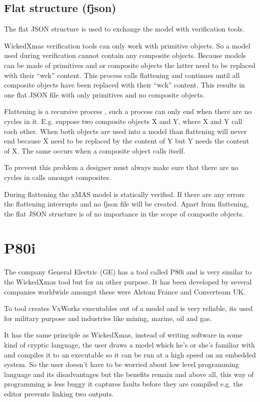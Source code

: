 \documentclass[a4paper,11pt,final]{article}
\begin{document}
\subsection{Flat structure (fjson)}
The flat JSON structure is used to exchange the model with verification tools.

WickedXmas verification tools can only work with primitive objects. So a model used during
verification cannot contain any composite objects.
Because models can be made of primitives and or composite objects the
latter need to be replaced with their ``wck'' content.
This process calls flattening and continues until all composite objects have
been replaced with their ``wck'' content.
This results in one flat JSON file with only primitives and no composite objects.

Flattening is a recursive process , such a process can only end when there are no cycles in it.
E.g. suppose two composite objects X and Y, where X and Y call each other.
When both objects are used into a model than flattening will never end because X need to be
replaced by the content of Y but Y needs the content of X.
The same occurs when a composite object calls itself.

To prevent this problem a designer must always make sure that there are no cycles in
calls amongst composites.

During flattening the xMAS model is statically verified.
If there are any errors the flattening interrupts and no fjson file will be created.
Apart from flattening, the flat JSON structure is of no importance
in the scope of composite objects.

\newpage
\section{P80i}
The company General Electric (GE) has a tool called P80i and is very similar
to the WickedXmas tool but for an other purpose.
It has been developed by several companies worldwide amongst these
were Alstom France and Converteam UK.

To tool creates VxWorks executables out of a model and is very reliable,
its used for military purpose and industries like mining, marine, oil and gas.

It has the same principle as WickedXmas, instead of writing software
in some kind of cryptic language, the user draws a model which he's
or she's familiar with and compiles it to an executable so it can be run
at a high speed on an embedded system.
So the user doesn't have to be worried about low level programming
language and its disadvantages but the benefits remain and 
above all, this way of programming is less buggy it captures
faults before they are compiled e.g. the editor prevents linking
two outputs.
\end{document}
